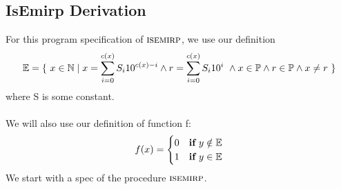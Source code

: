\documentclass[headings=small,a4paper,12pt]{scrartcl}
\newcommand{\isemirp}{\textsc{isemirp}\xspace}
\newcommand{\emirp}{\mathbb{E}}
\newcommand{\primeset}{\mathbb{P}}
\begin{document}
\subsection{IsEmirp Derivation}
\label{sec:isemirpderivation}
For this program specification of $\isemirp$, we use our definition
\begin{align*}
  \emirp = \{\ x \in \nat \mid x = \sum_{i=0}^{c(x)} S_{i}10^{c(x)-i}\And r = \sum_{i=0}^{c(x)} S_{i}10^{i}\ \And x \in \primeset \And r \in \primeset \And x \neq r\ \}
\end{align*}
where S is some constant.\\\\
We will also use our definition of function f:
\begin{align*}
  f(x) =
  \begin{cases}
      0 & \IF\ y\notin\emirp\\
      1 & \IF\ y\in\emirp
  \end{cases}
\end{align*}
We start with a spec of the procedure $\isemirp$.
\end{document}
